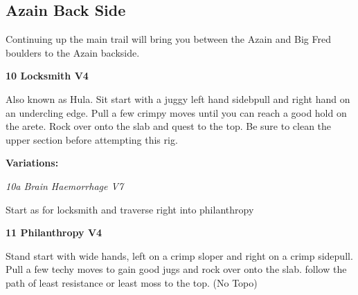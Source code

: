 \begin{multicols}{2}
			\subsection*{Azain Back Side}\label{bf:Azain Back Side}
			\begin{minipage}{\columnwidth}
			Continuing up the main trail will bring you between the Azain and Big Fred boulders to the Azain backside.
			\end{minipage}
			

					\begin{minipage}{\linewidth}	
					\label{rt:Locksmith}\colorbox{RoyalBlue!20}{\textbf{10 Locksmith V4 \ding{72}    \warn \warn }}
					\begin{adjustwidth}{0.5cm}{}				
					Also known as Hula. Sit start with a juggy left hand sidebpull and right hand on an undercling edge. Pull a few crimpy moves until you can reach a good hold on the arete. Rock over onto the slab and quest to the top. Be sure to clean the upper section before attempting this rig.
					\end{adjustwidth}
					\end{minipage}
						\begin{adjustwidth}{0.5cm}{}				
						\textbf{Variations:} \newline
							\begin{minipage}{\linewidth}	
							\label{vr:Brain Haemorrhage}\colorbox{Goldenrod!50}{\emph{10a Brain Haemorrhage V7  }}
							\begin{adjustwidth}{0.5cm}{}				
							Start as for locksmith and traverse right into philanthropy
							\end{adjustwidth}
							\end{minipage}
						\end{adjustwidth}
					\begin{minipage}{\linewidth}	
					\label{rt:Philanthropy}\colorbox{RoyalBlue!20}{\textbf{11 Philanthropy V4   \warn \warn }}
					\begin{adjustwidth}{0.5cm}{}				
					Stand start with wide hands, left on a crimp sloper and right on a crimp sidepull. Pull a few techy moves to gain good jugs and rock over onto the slab. follow the path of least resistance or least moss to the top.
						\newline (No Topo) 
					\end{adjustwidth}
					\end{minipage}

\end{multicols}
